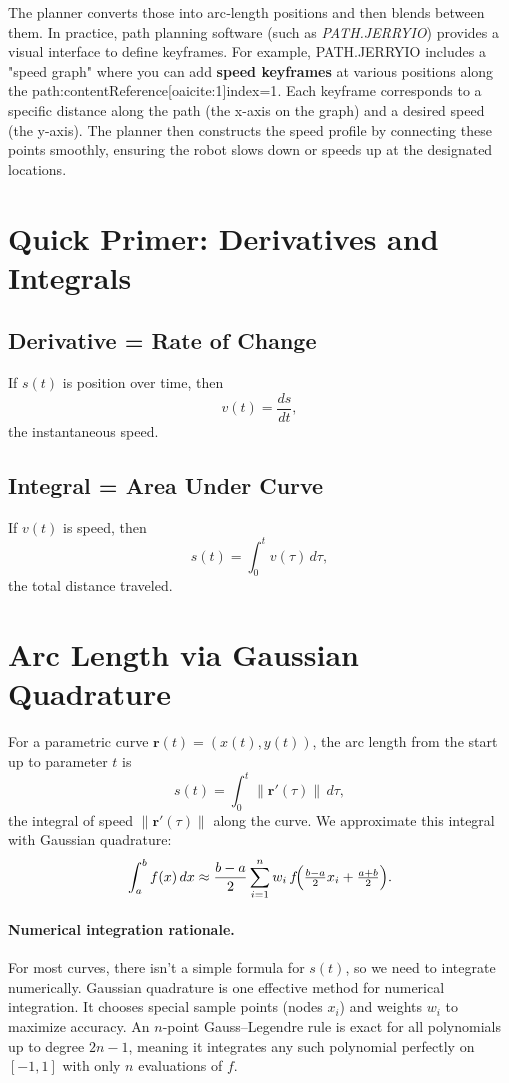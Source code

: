 \documentclass[11pt]{article}
\begin{document}
The planner converts those into arc‐length positions and then blends between them. In practice, path planning software (such as \textit{PATH.JERRYIO}) provides a visual interface to define keyframes. For example, PATH.JERRYIO includes a "speed graph" where you can add \textbf{speed keyframes} at various positions along the path:contentReference[oaicite:1]{index=1}. Each keyframe corresponds to a specific distance along the path (the x-axis on the graph) and a desired speed (the y-axis). The planner then constructs the speed profile by connecting these points smoothly, ensuring the robot slows down or speeds up at the designated locations.

\section{Quick Primer: Derivatives and Integrals}

\subsection*{Derivative = Rate of Change}

If \(s(t)\) is position over time, then
\[
v(t) = \frac{ds}{dt},
\]
the instantaneous speed.

\subsection*{Integral = Area Under Curve}

If \(v(t)\) is speed, then
\[
s(t) = \int_{0}^{t} v(\tau)\,d\tau,
\]
the total distance traveled.

\section{Arc Length via Gaussian Quadrature}

For a parametric curve \(\mathbf r(t) = (x(t), y(t))\), the arc length from the start up to parameter \(t\) is 
\[
s(t) = \int_{0}^{t} \|\mathbf r'(\tau)\|\,d\tau,
\] 
the integral of speed \(\|\mathbf r'(\tau)\|\) along the curve. We approximate this integral with Gaussian quadrature:
\[
\int_a^b f(x)\,dx \approx \frac{b-a}{2}\sum_{i=1}^n w_i\,f\!\Bigl(\tfrac{b-a}{2}x_i + \tfrac{a+b}{2}\Bigr).
\]

\paragraph{Numerical integration rationale.}%
For most curves, there isn't a simple formula for \(s(t)\), so we need to integrate numerically. Gaussian quadrature is one effective method for numerical integration. It chooses special sample points (nodes \(x_i\)) and weights \(w_i\) to maximize accuracy. An \(n\)-point Gauss–Legendre rule is exact for all polynomials up to degree \(2n-1\), meaning it integrates any such polynomial perfectly on \([-1,1]\) with only \(n\) evaluations of \(f\).
\end{document}
